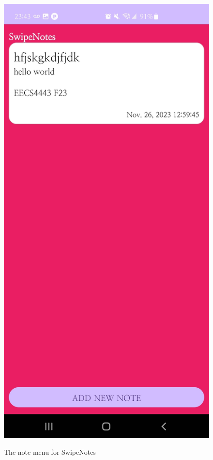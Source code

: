 \documentclass[conference]{IEEEtran}
\begin{document}
\begin{figure}[ht]
    \centering
    \includegraphics[scale=0.15]{images/notemenu.jpg}\\
    \caption{The note menu for SwipeNotes}
    \label{fig:enter-label}
\end{figure}
\end{document}
